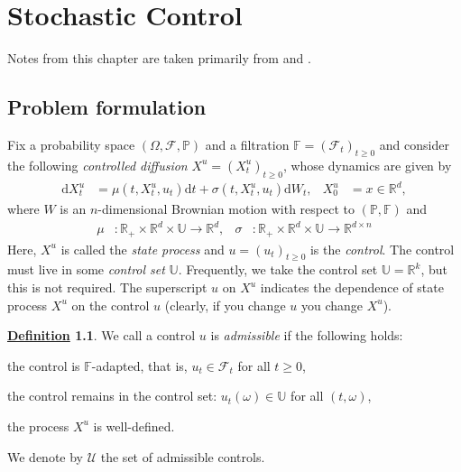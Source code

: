 \documentclass[12pt]{book}
\numberwithin{equation}{chapter}
\theoremstyle{plain}
\numberwithin{theorem}{section}
\theoremstyle{definition}
\newtheorem{definition}[theorem]{\underline{Definition}}
\numberwithin{exercise}{chapter}
\newcommand{\<}{\langle}
\renewcommand{\>}{\rangle}
\renewcommand{\(}{\left(}
\renewcommand{\)}{\right)}
\renewcommand{\[}{\left[}
\renewcommand{\]}{\right]}
\newcommand\Fb{\mathds{F}}
\newcommand\Pb{\mathds{P}}
\newcommand\Rb{\mathds{R}}
\newcommand\Ub{\mathds{U}}
\newcommand\Fc{\mathscr{F}}
\newcommand\Uc{\mathscr{U}}
\newcommand\om{\omega}
\newcommand\Om{\Omega}
\newcommand\sig{\sigma}
\newcommand\dd{\mathrm{d}}
\begin{document}
%
%

\chapter{Stochastic Control}
Notes from this chapter are taken primarily from \cite[Chapter 19]{bjork2004arbitrage} and \cite[Chapter 6]{vanhandel}.

\section{Problem formulation}
\label{sec:formulation}
Fix a probability space $(\Om,\Fc,\Pb)$ and a filtration $\Fb=(\Fc_t)_{t \geq 0}$ and consider the following \emph{controlled diffusion} $X^u = (X_t^u)_{t \geq 0}$, whose dynamics are given by
\begin{align}
\dd X_t^u
	&=	\mu(t,X_t^u,u_t) \dd t + \sig(t,X_t^u,u_t) \dd W_t , &
X_0^u
	&=	x \in \Rb^d , \label{eq:dXu}
\end{align}
where $W$ is an $n$-dimensional Brownian motion with respect to $(\Pb,\Fb)$ and
\begin{align}
\mu
	&:	\Rb_+ \times \Rb^d \times \Ub \to \Rb^d , &
\sig
	&:	\Rb_+ \times \Rb^d \times \Ub \to \Rb^{d \times n}
\end{align}
Here, $X^u$ is called the \emph{state process} and $u=(u_t)_{t \geq 0}$ is the \emph{control}.  The control must live in some \emph{control set} $\Ub$.  Frequently, we take the control set $\Ub = \Rb^k$, but this is not required.  The superscript $u$ on $X^u$ indicates the dependence of state process $X^u$ on the control $u$ (clearly, if you change $u$ you change $X^u$).

\begin{definition}
We call a control $u$ is \emph{admissible} if the following holds:
\begin{enumerate*}
\item the control is $\Fb$-adapted, that is, $u_t \in \Fc_t$ for all $t \geq 0$,
\item the control remains in the control set: $u_t(\om) \in \Ub$ for all $(t,\om)$,
\item the process $X^u$ is well-defined.
\end{enumerate*}
We denote by $\Uc$ the set of admissible controls.
\end{definition}
\end{document}
